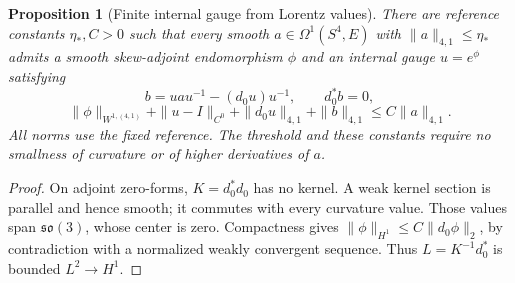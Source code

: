 \documentclass[11pt]{article}
\numberwithin{equation}{section}
\newtheorem{proposition}[theorem]{Proposition}
\theoremstyle{definition}
\theoremstyle{remark}
\begin{document}
\begin{proposition}[Finite internal gauge from Lorentz values]
\label{prop:finite-lorentz-gauge}
There are reference constants \(\eta_*,C>0\) such that every
smooth \(a\in\Omega^1(S^4,E)\) with \(\|a\|_{4,1}\le\eta_*\)
admits a smooth skew-adjoint endomorphism \(\phi\) and an internal
gauge \(u=e^\phi\) satisfying
\[
 b=u a u^{-1}-(d_0u)u^{-1},\qquad d_0^*b=0,
\]
\[
 \|\phi\|_{W^{1,(4,1)}}+\|u-I\|_{C^0}
       +\|d_0u\|_{4,1}+\|b\|_{4,1}\le C\|a\|_{4,1}.
\]
All norms use the fixed reference. The threshold and these
constants require no smallness of curvature or of higher
derivatives of \(a\).
\end{proposition}
\begin{proof}
On adjoint zero-forms, \(K=d_0^*d_0\) has no kernel.
A weak kernel section is parallel and hence smooth; it commutes
with every curvature value. Those values span
\(\mathfrak{so}(3)\), whose center is zero. Compactness gives
\(\|\phi\|_{H^1}\le C\|d_0\phi\|_2\), by contradiction with
a normalized weakly convergent sequence. Thus
\(L=K^{-1}d_0^*\) is bounded \(L^2\to H^1\).


\end{proof}
\end{document}
